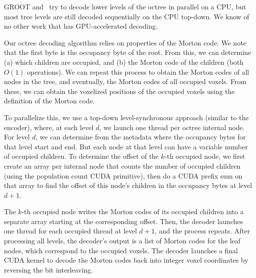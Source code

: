 %
GROOT and~\cite{octree-cpu2020} try to decode lower levels of the octree in parallel on a CPU, but most tree levels are still decoded sequentially on the CPU top-down.
%
We know of no other work that has GPU-accelerated decoding.

%
Our octree decoding algorithm relies on properties of the Morton code.
%
We note that the first byte is the occupancy byte of the root.
%
From this, we can determine (a) which children are occupied, and (b) the Morton code of the children (both $O(1)$ operations).
%
We can repeat this process to obtain the Morton codes of all nodes in the tree, and eventually, the Morton codes of all occupied voxels.
%
From these, we can obtain the voxelized positions of the occupied voxels using the definition of the Morton code.

To parallelize this, we use a top-down level-synchronous approach (similar to the encoder), where, at each level $d$, we launch one thread per octree internal node.
%
For level $d$, we can determine from the metadata where the occupancy bytes for that level start and end.
%
But each node at that level can have a variable number of occupied children.
%
To determine the offset of the $k$-th occupied node, we first create an array per internal node that counts the number of occupied children (using the population count CUDA primitive), then do a CUDA prefix sum on that array to find the offset of this node's children in the occupancy bytes at level $d+1$.

The $k$-th occupied node writes the Morton codes of its occupied children into a separate array starting at the corresponding offset.
%
Then, the decoder launches one thread for each occupied thread at level $d+1$, and the process repeats.
%
After processing all levels, the decoder's output is a list of Morton codes for the leaf nodes, which correspond to the occupied voxels.
%
The decoder launches a final CUDA kernel to decode the Morton codes back into integer voxel coordinates by reversing the bit interleaving.

